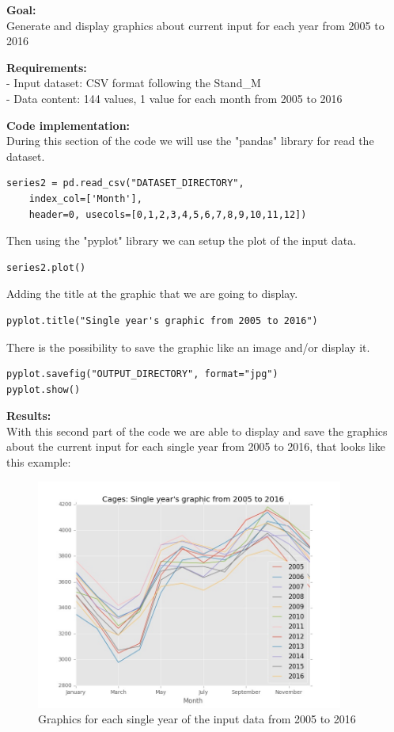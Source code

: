 \textbf{Goal:}\\
Generate and display graphics about current input for each year from 2005 to 2016

\textbf{Requirements:}\\
- Input dataset: CSV format following the Stand\_M \\
- Data content: 144 values, 1 value for each month from 2005 to 2016

\textbf{Code implementation:}\\
During this section of the code we will use the "pandas" library for read the dataset.
\begin{lstlisting}
series2 = pd.read_csv("DATASET_DIRECTORY", 
	index_col=['Month'], 
	header=0, usecols=[0,1,2,3,4,5,6,7,8,9,10,11,12])
\end{lstlisting}

Then using the "pyplot" library we can setup the plot of the input data.
\begin{lstlisting}
series2.plot()
\end{lstlisting}

Adding the title at the graphic that we are going to display.
\begin{lstlisting}
pyplot.title("Single year's graphic from 2005 to 2016")
\end{lstlisting}

There is the possibility to save the graphic like an image and/or display it.
\begin{lstlisting}
pyplot.savefig("OUTPUT_DIRECTORY", format="jpg")
pyplot.show()
\end{lstlisting}


\begin{minipage}{0.5\textwidth}
\textbf{Results:} \\
With this second part of the code we are able to display and save the graphics about the current input for each single year from 2005 to 2016, that looks like this example:
\end{minipage} \hfill
\begin{minipage}{0.45\textwidth}
\begin{figure}[H]
    \includegraphics[width=0.9\textwidth]{Files/Cages_Years.jpg}
    \caption{Graphics for each single year of the input data from 2005 to 2016}
\end{figure}
\end{minipage}



